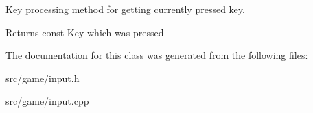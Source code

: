 Key processing method for getting currently pressed key. 

\begin{DoxyReturn}{Returns}
const Key which was pressed 
\end{DoxyReturn}


The documentation for this class was generated from the following files\+:\begin{DoxyCompactItemize}
\item 
src/game/input.\+h\item 
src/game/input.\+cpp\end{DoxyCompactItemize}
